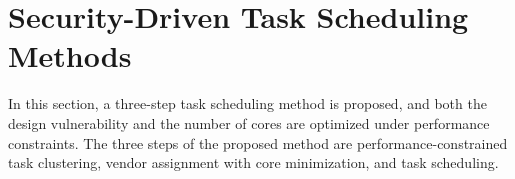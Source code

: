 \documentclass[10pt,journal, compsoc]{IEEEtran}
\begin{document}

















\section{Security-Driven Task Scheduling Methods}

In this section, a three-step task scheduling method is proposed, and both the design vulnerability and the number of cores are optimized under performance constraints. The three steps of the proposed method are performance-constrained task clustering, vendor assignment with core minimization, and task scheduling.
\end{document}
